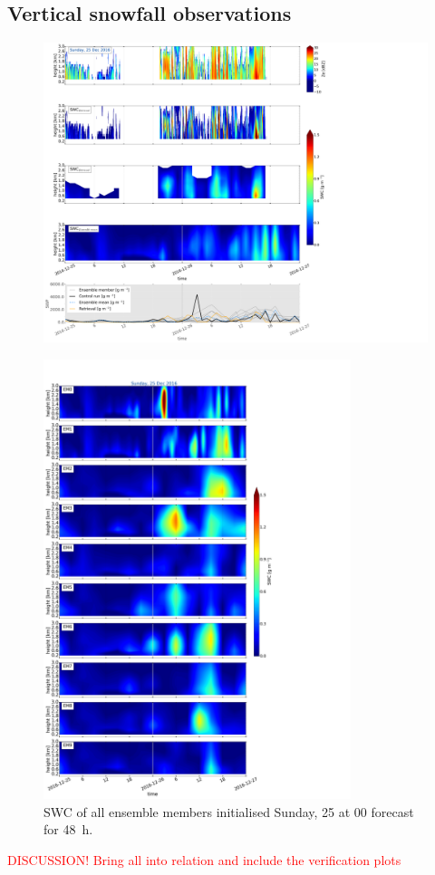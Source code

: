 \subsection{Vertical snowfall observations}\label{sec:vertEM09:2512}
\begin{figure}[t]
	\centering
	\includegraphics[trim={0.4cm .4cm 31.3cm 63.5cm},clip,width=\textwidth]{./fig_SWC/20161225}
	\caption{}\label{fig:SWP25}
\end{figure}
%
\begin{figure}[t]
	\centering
	\includegraphics[trim={0cm 0cm 18.3cm 5.1cm},clip,width=0.8\textwidth]{./fig_09EM/20161225}
	\caption{SWC of all ensemble members initialised Sunday, \SI{25}{\dec} at 0\SI{0}{\UTC} forecast for \SI{48}{\hour}.}\label{fig:EM09_25}
\end{figure}
\textcolor{red}{DISCUSSION! Bring all into relation and include the verification plots}

